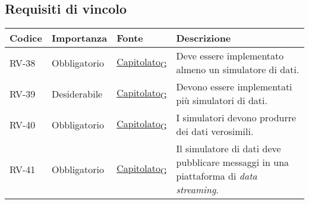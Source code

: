 \subsection{Requisiti di vincolo}
\begin{longtable}{|>{\centering\arraybackslash}m{}|>{\centering\arraybackslash}m{}|>{\centering\arraybackslash}m{}|>{\centering\arraybackslash}m{}|}
	\hline
	\textbf{Codice} & \textbf{Importanza} & \textbf{Fonte}                                                                                                    & \textbf{Descrizione}                                                                                                                                                                                                                                                                    \\\hline
	\endfirsthead
	\hline
	\endhead
	RV-38           & Obbligatorio        & \href{https://7last.github.io/docs/rtb/documentazione-interna/glossario\#capitolato}{Capitolato\textsubscript{G}} & Deve essere implementato almeno un simulatore di dati.                                                                                                                                                                                                                                  \\\hline
	RV-39           & Desiderabile        & \href{https://7last.github.io/docs/rtb/documentazione-interna/glossario\#capitolato}{Capitolato\textsubscript{G}} & Devono essere implementati più simulatori di dati.                                                                                                                                                                                                                                      \\\hline
	RV-40           & Obbligatorio        & \href{https://7last.github.io/docs/rtb/documentazione-interna/glossario\#capitolato}{Capitolato\textsubscript{G}} & I simulatori devono produrre dei dati verosimili.                                                                                                                                                                                                                                       \\\hline
	RV-41           & Obbligatorio        & \href{https://7last.github.io/docs/rtb/documentazione-interna/glossario\#capitolato}{Capitolato\textsubscript{G}} & Il simulatore di dati deve pubblicare messaggi in una piattaforma di \textit{data streaming}.                                                                                                                                                                                           \\\hline

\end{longtable}
